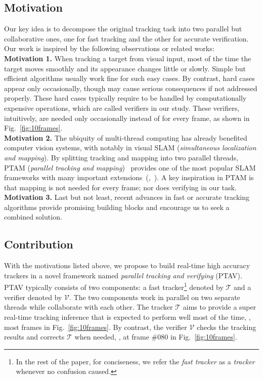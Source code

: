 \documentclass[10pt,twocolumn,letterpaper]{article}
\def \TRK{\mathcal{T}}
\def \VRF{\mathcal{V}}
\begin{document}
\subsection{Motivation}

Our key idea is to decompose the original tracking task into two parallel but collaborative ones, one for fast tracking and the other for accurate verification. Our work is inspired by the following observations or related works:
\\
\textbf{Motivation 1.} When tracking a target from visual input, most of the time the target moves smoothly and its appearance changes little or slowly. Simple but efficient algorithms usually work fine for such easy cases. By contrast, hard cases appear only occasionally, though may cause serious consequences if not addressed properly. These hard cases typically require to be handled by computationally expensive operations, which are called verifiers in our study. These verifiers, intuitively, are needed only occasionally instead of for every frame, as shown in Fig.~\ref{fig:10frames}.
\\
\textbf{Motivation 2.} The ubiquity of multi-thread computing has already benefited computer vision systems, with notably in visual SLAM (\emph{simultaneous localization and mapping}). By splitting tracking and mapping into two parallel threads, PTAM (\emph{parallel tracking and mapping})~\cite{klein2007parallel} provides one of the most popular SLAM frameworks with many important extensions~(\eg,~\cite{ORB-SLAM}). A key inspiration in PTAM is that mapping is not needed for every frame; nor does verifying in our task.
\\
\textbf{Motivation 3.} Last but not least, recent advances in fast or accurate tracking algorithms provide promising building blocks and encourage us to seek a combined solution.

\subsection{Contribution}

With the motivations listed above, we propose to build real-time high accuracy trackers in a novel framework named \emph{parallel tracking and verifying} (PTAV). PTAV typically consists of two components: a fast tracker\footnote{In the rest of the paper, for conciseness, we refer the \emph{fast tracker} as a \emph{tracker} whenever no confusion caused.} denoted by $\TRK$ and a verifier denoted by $\VRF$.  The two components work in parallel on two separate threads while collaborate with each other. The tracker $\TRK$ aims to provide a super real-time tracking inference that is expected to perform well most of the time, \eg, most frames in Fig.~\ref{fig:10frames}. By contrast, the verifier $\VRF$ checks the tracking results and corrects $\TRK$ when needed, \eg, at frame \#080 in Fig.~\ref{fig:10frames}.
\end{document}

